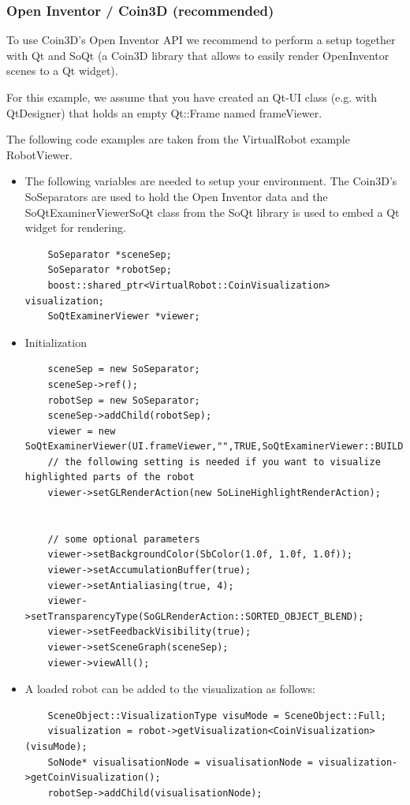 \subsubsection*{Open Inventor / Coin3D (recommended)}
To use Coin3D's Open Inventor API we recommend to perform a setup together with Qt and SoQt (a Coin3D library that allows to easily render OpenInventor scenes to a Qt widget).\par
For this example, we assume that you have created an Qt-UI class (e.g. with QtDesigner) that holds an empty Qt::Frame named frameViewer.\par
The following code examples are taken from the VirtualRobot example RobotViewer. 
\begin{itemize}
\item The following variables are needed to setup your environment. The Coin3D's SoSeparators are used to hold the Open Inventor data and the SoQtExaminerViewerSoQt class from the SoQt library is used to embed a Qt widget for rendering.
\begin{lstlisting}
	SoSeparator *sceneSep;
    SoSeparator *robotSep;
    boost::shared_ptr<VirtualRobot::CoinVisualization> visualization;
    SoQtExaminerViewer *viewer;
\end{lstlisting}
\item Initialization 
\begin{lstlisting}
    sceneSep = new SoSeparator;
    sceneSep->ref();
    robotSep = new SoSeparator;
    sceneSep->addChild(robotSep);
    viewer = new SoQtExaminerViewer(UI.frameViewer,"",TRUE,SoQtExaminerViewer::BUILD_POPUP);
    // the following setting is needed if you want to visualize highlighted parts of the robot
    viewer->setGLRenderAction(new SoLineHighlightRenderAction);


    // some optional parameters
    viewer->setBackgroundColor(SbColor(1.0f, 1.0f, 1.0f));
    viewer->setAccumulationBuffer(true);
    viewer->setAntialiasing(true, 4);
    viewer->setTransparencyType(SoGLRenderAction::SORTED_OBJECT_BLEND);
    viewer->setFeedbackVisibility(true);
    viewer->setSceneGraph(sceneSep);
    viewer->viewAll();
\end{lstlisting}
\item A loaded robot can be added to the visualization as follows:
 \begin{lstlisting}
    SceneObject::VisualizationType visuMode = SceneObject::Full;
    visualization = robot->getVisualization<CoinVisualization>(visuMode);
    SoNode* visualisationNode = visualisationNode = visualization->getCoinVisualization();
    robotSep->addChild(visualisationNode);
\end{lstlisting}
\end{itemize}


